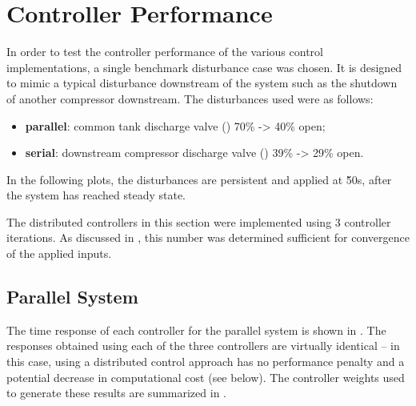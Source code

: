 \section{Controller Performance}
\label{sec:results:performance}

\newif\ifmakeplots
\makeplotstrue


In order to test the controller performance of the various control implementations, a single benchmark disturbance case was chosen.
It is designed to mimic a typical disturbance downstream of the system such as the shutdown of another compressor downstream.
The disturbances used were as follows:

\begin{itemize}
  \item \textbf{parallel}: common tank discharge valve () 70\% -> 40\% open;
  \item \textbf{serial}: downstream compressor discharge valve () 39\% -> 29\% open.
\end{itemize}
In the following plots, the disturbances are persistent and applied at \u{50}{s}, after the system has reached steady state.

The distributed controllers in this section were implemented using 3 controller iterations. 
As discussed in , this number was determined sufficient for convergence of the applied inputs.


\subsection{Parallel System}
\label{sec:results:performance:parallel}


The time response of each controller for the parallel system is shown in .
The responses obtained using each of the three controllers are virtually identical -- in this case, using a distributed control approach has no performance penalty and a potential decrease in computational cost (see below).
The controller weights used to generate these results are summarized in .


